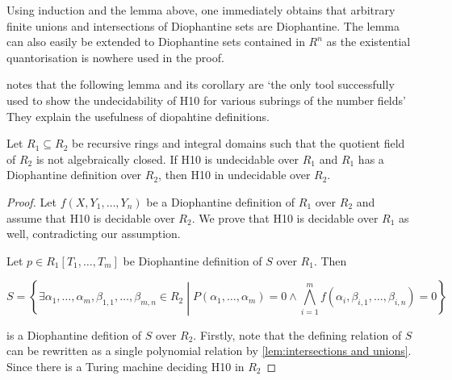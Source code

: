 Using induction and the lemma above, one immediately obtains that
arbitrary finite unions and intersections of Diophantine sets are
Diophantine. The lemma can also easily be extended to Diophantine sets
contained in $R^n$ as the existential quantorisation is nowhere used
in the proof.

\textcite{Shlapentokh2000} notes that the following lemma and its corollary are
`the only tool successfully used to show the undecidability of \textsc{H10}
for various subrings of the number fields' They explain the usefulness
of diopahtine definitions.

\begin{lem} \label{lem:moving up}
Let $R_1 \subseteq R_2$ be recursive rings and integral domains such
that the quotient field of $R_2$ is not algebraically closed. If H10
is undecidable over $R_1$ and $R_1$ has a Diophantine definition over
$R_2$, then H10 in undecidable over $R_2$.
\end{lem}

\begin{proof}
Let $f(X, Y_1, …, Y_n)$ be a Diophantine definition of $R_1$ over
$R_2$ and assume that H10 is decidable over $R_2$. We prove that H10
is decidable over $R_1$ as well, contradicting our assumption.

Let $p ∈ R_1[T_1, …, T_m]$ be Diophantine definition of $S$ over
$R_1$. Then

\[ S = \left\lbrace ∃α_1,…,α_m, β_{1,1}, …, β_{m,n} ∈ R_2 \middle| P(α_1, …, α_m) = 0 ∧ \bigwedge_{i=1}^m f(α_i, β_{i,1},…,β_{i,n}) = 0 \right\rbrace\]

is a Diophantine defition of $S$ over $R_2$. Firstly, note that the
defining relation of $S$ can be rewritten as a single polynomial
relation by \cref{lem:intersections and unions}. Since there is
a Turing machine deciding \textsc{H10} in $R_2$
\end{proof}
